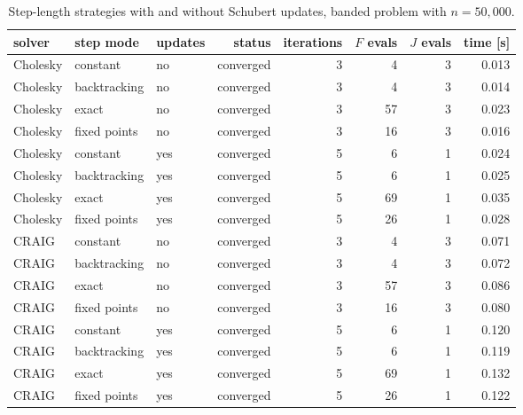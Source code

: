\begin{table}[htbp]
\centering
\caption{Step-length strategies with and without Schubert updates, banded problem with $n = 50{,}000$.}
\label{tab:steps}
\small
\begin{tabular}{@{}lllrrrrr@{}}
\toprule
solver & step mode & updates & status & iterations & $F$ evals & $J$ evals & time [s] \\
\midrule
Cholesky & constant & no & converged & 3 & 4 & 3 & 0.013 \\
Cholesky & backtracking & no & converged & 3 & 4 & 3 & 0.014 \\
Cholesky & exact & no & converged & 3 & 57 & 3 & 0.023 \\
Cholesky & fixed points & no & converged & 3 & 16 & 3 & 0.016 \\
Cholesky & constant & yes & converged & 5 & 6 & 1 & 0.024 \\
Cholesky & backtracking & yes & converged & 5 & 6 & 1 & 0.025 \\
Cholesky & exact & yes & converged & 5 & 69 & 1 & 0.035 \\
Cholesky & fixed points & yes & converged & 5 & 26 & 1 & 0.028 \\
\midrule
CRAIG & constant & no & converged & 3 & 4 & 3 & 0.071 \\
CRAIG & backtracking & no & converged & 3 & 4 & 3 & 0.072 \\
CRAIG & exact & no & converged & 3 & 57 & 3 & 0.086 \\
CRAIG & fixed points & no & converged & 3 & 16 & 3 & 0.080 \\
CRAIG & constant & yes & converged & 5 & 6 & 1 & 0.120 \\
CRAIG & backtracking & yes & converged & 5 & 6 & 1 & 0.119 \\
CRAIG & exact & yes & converged & 5 & 69 & 1 & 0.132 \\
CRAIG & fixed points & yes & converged & 5 & 26 & 1 & 0.122 \\
\bottomrule
\end{tabular}
\end{table}
